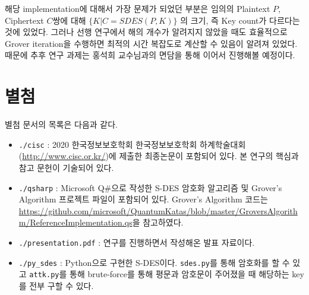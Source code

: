 \documentclass{article}
\theoremstyle{break}
\begin{document}
	해당 implementation에 대해서 가장 문제가 되었던 부분은 임의의 Plaintext $P$, Ciphertext $C$쌍에 대해 $\{K|C=SDES(P,K)\}$ 의 크기, 즉 Key count가 다르다는 것에 있었다. 그러나 선행 연구에서 해의 개수가 알려지지 않았을 때도 효율적으로 Grover iteration을 수행하면 최적의 시간 복잡도로 계산할 수 있음이 알려져 있었다. 때문에 추후 연구 과제는 홍석희 교수님과의 면담을 통해 이어서 진행해볼 예정이다.
	
    \section*{별첨}
    
    별첨 문서의 목록은 다음과 같다.
    \begin{itemize}
    \item \verb|./cisc| : 2020 한국정보보호학회 한국정보보호학회 하계학술대회(\url{http://www.cisc.or.kr/})에 제출한 최종논문이 포함되어 있다. 본 연구의 핵심과 참고 문헌이 기술되어 있다.
    \item \verb|./qsharp| : Microsoft Q\#으로 작성한 S-DES 암호화 알고리즘 및 Grover's Algorithm 프로젝트 파일이 포함되어 있다. Grover's Algorithm 코드는 \url{https://github.com/microsoft/QuantumKatas/blob/master/GroversAlgorithm/ReferenceImplementation.qs}을 참고하였다.
    \item \verb|./presentation.pdf| : 연구를 진행하면서 작성해온 발표 자료이다.
    \item \verb|./py_sdes| : Python으로 구현한 S-DES이다. \verb|sdes.py|를 통해 암호화를 할 수 있고 \verb|attk.py|를 통해 brute-force를 통해 평문과 암호문이 주어졌을 때 해당하는 key를 전부 구할 수 있다.
    \end{itemize}
\end{document}

